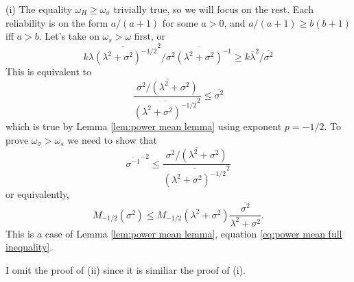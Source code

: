 \documentclass{article}
\makeatletter
\theoremstyle{plain}
\theoremstyle{plain}
\theoremstyle{definition}
\theoremstyle{remark}
\theoremstyle{definition}
\theoremstyle{plain}
\theoremstyle{plain}
\theoremstyle{definition}
\newenvironment{proof}[1][\protect\proofname]{\par
	\normalfont\topsep6\p@\@plus6\p@\relax
	\trivlist
	\itemindent\parindent
	\item[\hskip\labelsep\scshape #1]\ignorespaces
}{%
	\endtrivlist\@endpefalse
}
\providecommand{\proofname}{Proof}
\makeatother
\begin{document}
\begin{proof}[Proof of Proposition \ref{thm:Properties of three}]\label{proof:Properties}
(i) The equality $\omega_H \geq \omega_\sigma$ trivially true, so we will focus on the rest. Each reliability is on the form $a/(a+1)$ for some $a>0$, and $a/(a+1)\geq b(b+1)$
iff $a>b$. Let's take on $\omega_s > \omega$ first, or
\[
k\overline{\lambda(\lambda^{2}+\sigma^{2})^{-1/2}}^{2}/\overline{\sigma^{2}(\lambda^{2}+\sigma^{2})^{-1}}\geq k\overline{\lambda}^{2}/\overline{\sigma^{2}}
\]
This is equivalent to 
\[
\frac{\overline{\sigma^{2}/(\lambda^{2}+\sigma^{2})}}{\overline{(\lambda^{2}+\sigma^{2})^{-1/2}}^{2}}\leq\overline{\sigma^{2}}
\]
which is true by Lemma \ref{lem:power mean lemma} using exponent $p = -1/2$.
To prove $\omega_{\sigma}>\omega_{s}$ we need to show that
\[
\overline{\sigma^{-1}}^{-2}\leq\frac{\overline{\sigma^{2}/(\lambda^{2}+\sigma^{2})}}{\overline{(\lambda^{2}+\sigma^{2})^{-1/2}}^{2}}
\]
or equivalently,
\[
M_{-1/2}\left(\sigma^{2}\right)\leq M_{-1/2}\left(\lambda^{2}+\sigma^{2}\right)\overline{\frac{\sigma^{2}}{\lambda^{2}+\sigma^{2}}}.
\]
This is a case of Lemma \ref{lem:power mean lemma}, equation \eqref{eq:power mean full inequality}.

I omit the proof of (ii) since it is similiar the proof of (i).


\end{proof}



\end{document}
